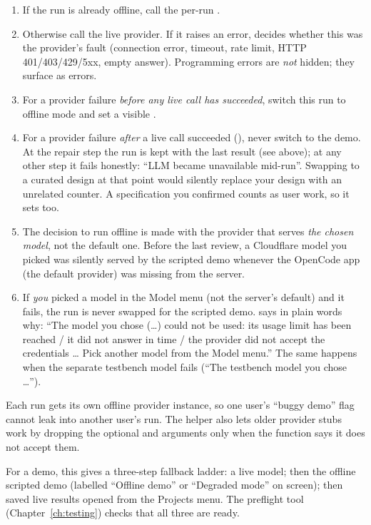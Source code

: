 \begin{enumerate}
  \item If the run is already offline, call the per-run .
  \item Otherwise call the live provider. If it raises an error,  decides whether this was the provider's fault (connection error, timeout, rate limit, HTTP 401/403/429/5xx, empty answer). Programming errors are \emph{not} hidden; they surface as errors.
  \item For a provider failure \emph{before any live call has succeeded}, switch this run to offline mode and set a visible .
  \item For a provider failure \emph{after} a live call succeeded (), never switch to the demo. At the repair step the run is kept with the last result (see above); at any other step it fails honestly: ``LLM became unavailable mid-run''. Swapping to a curated design at that point would silently replace your design with an unrelated counter. A specification you confirmed counts as user work, so it sets  too.
  \item The decision to run offline is made with the provider that serves \emph{the chosen model}, not the default one. Before the last review, a Cloudflare model you picked was silently served by the scripted demo whenever the OpenCode app (the default provider) was missing from the server.
  \item If \emph{you} picked a model in the Model menu (not the server's default) and it fails, the run is never swapped for the scripted demo.  says in plain words why: ``The model you chose (\ldots) could not be used: its usage limit has been reached / it did not answer in time / the provider did not accept the credentials \ldots{} Pick another model from the Model menu.'' The same happens when the separate testbench model fails (``The testbench model you chose \ldots'').
\end{enumerate}

Each run gets its own offline provider instance, so one user's ``buggy demo'' flag cannot leak into another user's run. The helper  also lets older provider stubs work by dropping the optional  and  arguments only when the function says it does not accept them.

For a demo, this gives a three-step fallback ladder: a live model; then the offline scripted demo (labelled ``Offline demo'' or ``Degraded mode'' on screen); then saved live results opened from the Projects menu. The preflight tool (Chapter~\ref{ch:testing}) checks that all three are ready.

